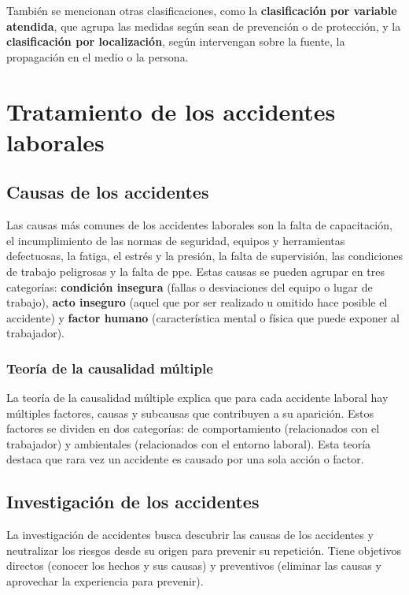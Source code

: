 También se mencionan otras clasificaciones, como la \textbf{clasificación por 
    variable atendida}, que agrupa las medidas según sean de prevención o de 
protección, y la \textbf{clasificación por localización}, según intervengan 
sobre la fuente, la propagación en el medio o la persona. 

\section{Tratamiento de los accidentes laborales}

\subsection{Causas de los accidentes}

Las causas más comunes de los accidentes laborales son la falta de 
capacitación, el incumplimiento de las normas de seguridad, equipos y 
herramientas defectuosas, la fatiga, el estrés y la presión, la falta de 
supervisión, las condiciones de trabajo peligrosas y la falta de 
\acrshort{ppe}. Estas causas se pueden agrupar en tres categorías: 
\textbf{condición insegura} (fallas o desviaciones del equipo o lugar de 
trabajo), \textbf{acto inseguro} (aquel que por ser realizado u omitido hace 
posible el accidente) y \textbf{factor humano} (característica mental o física
que puede exponer al trabajador).

\subsubsection{Teoría de la causalidad múltiple}

La teoría de la causalidad múltiple explica que para cada accidente laboral hay
múltiples factores, causas y subcausas que contribuyen a su aparición. Estos 
factores se dividen en dos categorías: de comportamiento (relacionados con el 
trabajador) y ambientales (relacionados con el entorno laboral). Esta teoría 
destaca que rara vez un accidente es causado por una sola acción o factor.

\subsection{Investigación de los accidentes}

La investigación de accidentes busca descubrir las causas de los accidentes y 
neutralizar los riesgos desde su origen para prevenir su repetición. Tiene 
objetivos directos (conocer los hechos y sus causas) y preventivos 
(eliminar las causas y aprovechar la experiencia para prevenir).

